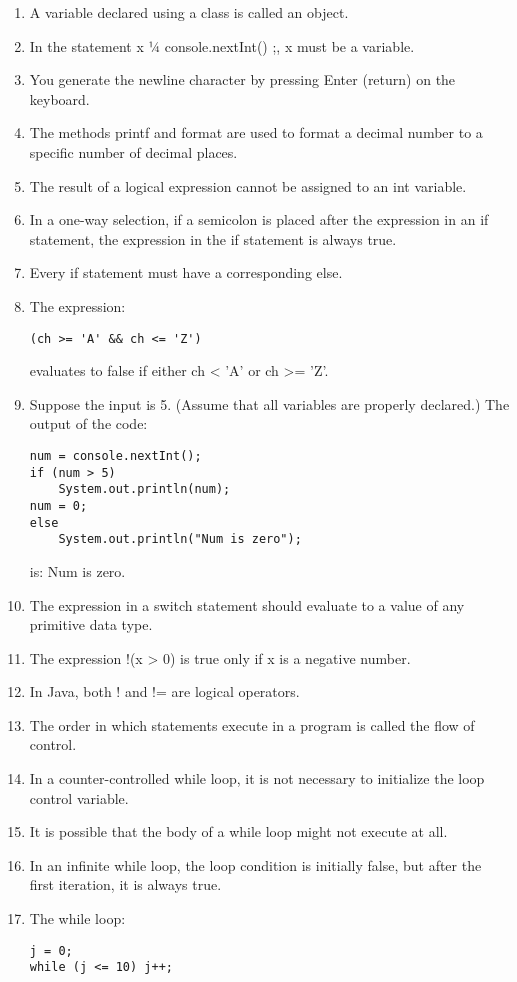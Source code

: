 \documentclass[12pt,a4paper,final,twoside,onecolumn,titlepage]{book}
\begin{document}
\begin{enumerate}
\item A variable declared using a class is called an object.
\item In the statement x 1⁄4 console.nextInt() ;, x must be a variable.
\item You generate the newline character by pressing Enter (return) on the keyboard.
\item The methods printf and format are used to format a decimal number to a specific number of decimal places.
\item The result of a logical expression cannot be assigned to an int variable. 
\item In a one-way selection, if a semicolon is placed after the expression in an if statement, the expression in the if statement is always true. 
\item Every if statement must have a corresponding else.
\item The expression:
\begin{lstlisting}
(ch >= 'A' && ch <= 'Z')
\end{lstlisting}
evaluates to false if either ch < 'A' or ch >= 'Z'.
\item Suppose the input is 5. (Assume that all variables are properly declared.) The output of the code:
\begin{lstlisting}
num = console.nextInt(); 
if (num > 5)
    System.out.println(num);
num = 0;
else
	System.out.println("Num is zero");
\end{lstlisting}
is: Num is zero.
\item The expression in a switch statement should evaluate to a value of any primitive data type.
\item The expression !(x > 0) is true only if x is a negative number. 
\item In Java, both ! and != are logical operators.
\item The order in which statements execute in a program is called the flow of control.
\item In a counter-controlled while loop, it is not necessary to initialize the loop control variable.
\item It is possible that the body of a while loop might not execute at all.
\item In an infinite while loop, the loop condition is initially false, but after the first iteration, it is always true.
\item The while loop:
\begin{lstlisting}
j = 0;
while (j <= 10) j++;
\end{lstlisting}

\end{enumerate}
\end{document}
